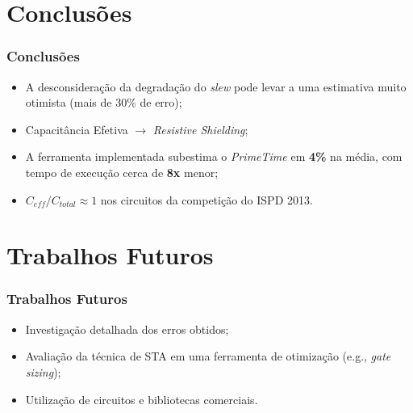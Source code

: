 \documentclass[10pt,a4paper]{beamer}
\begin{document}
		
		
	
	\section{Conclusões}
	
		\begin{frame}[t]
		\frametitle{Conclusões}
			\begin{itemize}
				\item A desconsideração da degradação do \textit{slew} pode levar a uma estimativa muito otimista (mais de 30\% de erro);
				
				\item Capacitância Efetiva $\to$ \textit{Resistive Shielding};
				
				\item A ferramenta implementada subestima o \textit{PrimeTime} em \textbf{4\%} na média, com tempo de execução  cerca de \textbf{8x} menor;
				
				\item $C_{eff} / C_{total} \approx 1$ nos circuitos da competição do ISPD 2013.
			\end{itemize}
		\end{frame}
	
	\section{Trabalhos Futuros}
		
		\begin{frame}[t]
		\frametitle{Trabalhos Futuros}
			\begin{itemize}
				\item Investigação detalhada dos erros obtidos;
				
				\item Avaliação da técnica de STA em uma ferramenta de otimização (e.g., \textit{gate sizing});
				
				\item Utilização de circuitos e bibliotecas comerciais.
			\end{itemize}
		\end{frame}
		
	\section*{}
	\frame{\titlepage}
	
\end{document}
